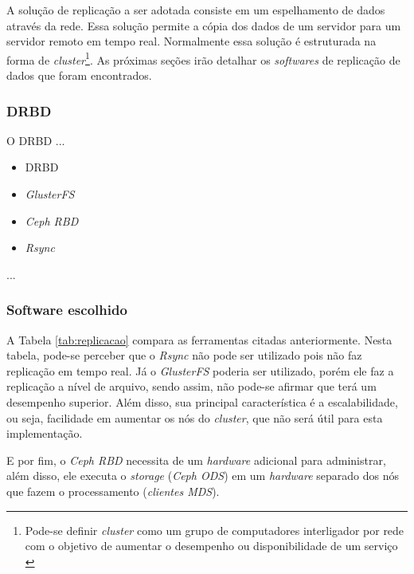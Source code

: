 A solução de replicação a ser adotada consiste em um espelhamento de dados através da rede. Essa solução permite a cópia dos dados de um servidor
para um servidor remoto em tempo real. Normalmente essa solução é estruturada na forma de \textit{cluster}\footnote[1]{Pode-se definir 
\textit{cluster} como um grupo de computadores interligador por rede com o objetivo de aumentar o desempenho ou disponibilidade de um serviço 
\cite{freitas2005}}.
As próximas seções irão detalhar os \textit{softwares} de replicação de dados que foram encontrados.

\subsubsection{DRBD}
\label{section:drbd}
O \ac{DRBD} ...

\begin{itemize}
 \item \ac{DRBD} \cite{drbd}
 \item \textit{GlusterFS} \cite{glusterfs}
 \item \textit{Ceph RBD} \cite{cephrbd}
 \item \textit{Rsync} \cite{rsync}
\end{itemize}

...

\subsubsection{Software escolhido}
\label{section:replicacaoescolhido}

A Tabela \ref{tab:replicacao} compara as ferramentas citadas anteriormente. Nesta tabela, pode-se perceber que o \textit{Rsync} não pode ser
utilizado pois não faz replicação em tempo real. Já o \textit{GlusterFS} poderia ser utilizado, porém ele faz a replicação a nível de arquivo, 
sendo assim, não pode-se afirmar que terá um desempenho superior. Além disso, sua principal característica é a escalabilidade, ou seja, 
facilidade em aumentar os nós do \textit{cluster}, que não será útil para esta implementação.

E por fim, o \textit{Ceph RBD} necessita de um \textit{hardware} adicional para administrar, além disso, ele executa o \textit{storage} 
(\textit{Ceph ODS}) em um \textit{hardware} separado dos nós que fazem o processamento (\textit{clientes MDS}). %

